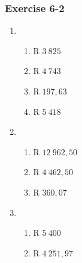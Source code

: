 \begin{multicols}{3}
\subsubsection*{Exercise 6-2} %
    \begin{enumerate}[label=\textbf{\arabic*}.]
	\item %
	\begin{enumerate}[noitemsep, label=\textbf{(\alph*)} ]
	    \item R $3~ 825$%
	    \item R $4 ~743$%
	    \item R $197,63$%
	    \item R $5~ 418$%
	\end{enumerate}


	\item %
	\begin{enumerate}[noitemsep, label=\textbf{(\alph*)} ]
	    \item R $12~962,50$%
	    \item R $4~ 462,50$ %
	    \item R $360,07$%
	\end{enumerate}

	\item %
	\begin{enumerate}[noitemsep, label=\textbf{(\alph*)} ]
	    \item R $5~ 400$%
	    \item R $4 ~251,97$%
	\end{enumerate}
    \end{enumerate}

\end{multicols}
